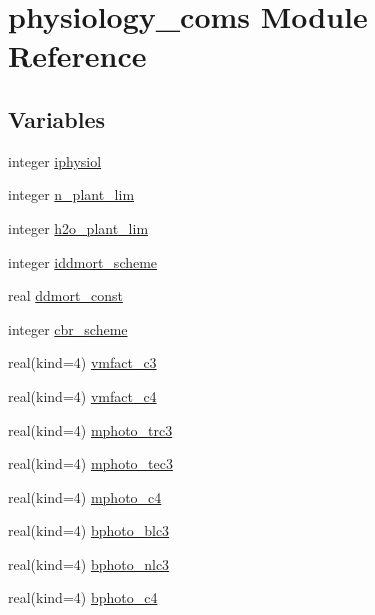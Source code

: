 \hypertarget{namespacephysiology__coms}{}\section{physiology\+\_\+coms Module Reference}
\label{namespacephysiology__coms}
\subsection*{Variables}
\begin{DoxyCompactItemize}
\item 
integer \hyperlink{namespacephysiology__coms_ae3ae55cb0b3b3e4ac3fad3829d422940}{iphysiol}
\item 
integer \hyperlink{namespacephysiology__coms_ae25a0a523887f680c687728a8b285400}{n\+\_\+plant\+\_\+lim}
\item 
integer \hyperlink{namespacephysiology__coms_a9762f60703c45a15a967cb86431ffff3}{h2o\+\_\+plant\+\_\+lim}
\item 
integer \hyperlink{namespacephysiology__coms_a2933521a1d1ea3626c77432b305b9f16}{iddmort\+\_\+scheme}
\item 
real \hyperlink{namespacephysiology__coms_a4f1ff928c4e75edf5caea5bf68deecf6}{ddmort\+\_\+const}
\item 
integer \hyperlink{namespacephysiology__coms_a95059b30f39e01aae14790e04a2bee65}{cbr\+\_\+scheme}
\item 
real(kind=4) \hyperlink{namespacephysiology__coms_a07128356874806c751549ba416793e1f}{vmfact\+\_\+c3}
\item 
real(kind=4) \hyperlink{namespacephysiology__coms_aee570c0398d070cf6c07ee3146b77c05}{vmfact\+\_\+c4}
\item 
real(kind=4) \hyperlink{namespacephysiology__coms_a3dfbe191e81a908c50c593e9a147469a}{mphoto\+\_\+trc3}
\item 
real(kind=4) \hyperlink{namespacephysiology__coms_a10f9a3f8b0759641e8f9997d77f01fa8}{mphoto\+\_\+tec3}
\item 
real(kind=4) \hyperlink{namespacephysiology__coms_a08c8e567e9ac2f38e5386c00b1069335}{mphoto\+\_\+c4}
\item 
real(kind=4) \hyperlink{namespacephysiology__coms_af223ea7d50d62345508e6ab92ee4dafc}{bphoto\+\_\+blc3}
\item 
real(kind=4) \hyperlink{namespacephysiology__coms_a08a6a0d248f95a16dd7a7206ec807fd4}{bphoto\+\_\+nlc3}
\item 
real(kind=4) \hyperlink{namespacephysiology__coms_a4f00e884edf8cdf98d03e6384afed7f4}{bphoto\+\_\+c4}

\end{DoxyCompactItemize}
